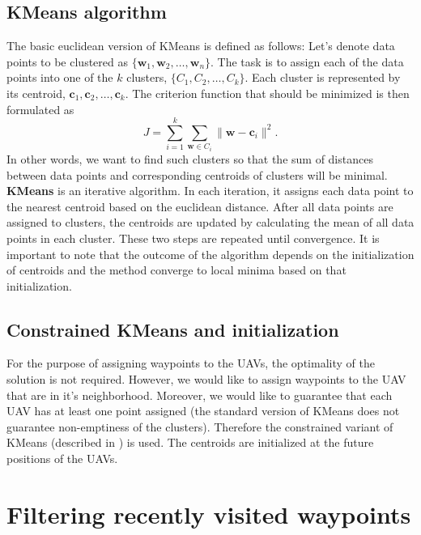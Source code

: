 \subsection{KMeans algorithm}
The basic euclidean version of KMeans is defined as follows:
Let's denote data points to be clustered as $\{\mathbf{w}_{1}, \mathbf{w}_{2}, \dots , \mathbf{w}_{n}\}$.
The task is to assign each of the data points into one of the $k$ clusters, $\{C_{1}, C_{2}, \dots, C_{k}\}$.
Each cluster is represented by its centroid, $\mathbf{c}_{1}, \mathbf{c}_{2}, \dots, \mathbf{c}_{k}$.
The criterion function that should be minimized is then formulated as
\begin{equation}
  J = \sum_{i = 1}^{k} \sum_{\mathbf{w} \in C_{i}} \| \mathbf{w} - \mathbf{c}_{i} \|^{2}.
\end{equation}
In other words, we want to find such clusters so that the sum of distances between data points and corresponding centroids of clusters will be minimal.
\textbf{KMeans} is an iterative algorithm.
In each iteration, it assigns each data point to the nearest centroid based on the euclidean distance. 
After all data points are assigned to clusters, the centroids are updated by calculating the mean of all data points in each cluster. 
These two steps are repeated until convergence.
It is important to note that the outcome of the algorithm depends on the initialization of centroids and the method converge to local minima based on that initialization.

\subsection{Constrained KMeans and initialization}
For the purpose of assigning waypoints to the \ac{UAV}s, the optimality of the solution is not required.
However, we would like to assign waypoints to the \ac{UAV} that are in it's neighborhood.
Moreover, we would like to guarantee that each \ac{UAV} has at least one point assigned (the standard version of KMeans does not guarantee non-emptiness of the clusters).
Therefore the constrained variant of KMeans (described in \cite{constrained_kmeans}) is used.
The centroids are initialized at the future positions of the \ac{UAV}s.





\section{Filtering recently visited waypoints}



